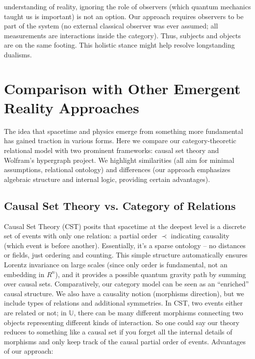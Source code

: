 \documentclass{article}
\begin{document}
\begin{description}
understanding of reality, ignoring the role of observers (which quantum mechanics taught us is important) is not an option. Our approach requires observers to be part of the system (no external classical observer was ever assumed; all measurements are interactions inside the category). Thus, subjects and objects are on the same footing. This holistic stance might help resolve longstanding dualisms.
\end{description}

\section{Comparison with Other Emergent Reality Approaches}

The idea that spacetime and physics emerge from something more fundamental has gained traction in various forms. Here we compare our category-theoretic relational model with two prominent frameworks: causal set theory and Wolfram’s hypergraph project. We highlight similarities (all aim for minimal assumptions, relational ontology) and differences (our approach emphasizes algebraic structure and internal logic, providing certain advantages).

\subsection{Causal Set Theory vs. Category of Relations}

Causal Set Theory (CST) posits that spacetime at the deepest level is a discrete set of events with only one relation: a partial order $\prec$ indicating causality (which event is before another)\cite{bombelli1987}. Essentially, it’s a sparse ontology – no distances or fields, just ordering and counting. This simple structure automatically ensures Lorentz invariance on large scales (since only order is fundamental, not an embedding in $R^n$), and it provides a possible quantum gravity path by summing over causal sets. Comparatively, our category model can be seen as an “enriched” causal structure. We also have a causality notion (morphisms direction), but we include types of relations and additional symmetries. In CST, two events either are related or not; in $\mathbb{U}$, there can be many different morphisms connecting two objects representing different kinds of interaction. So one could say our theory reduces to something like a causal set if you forget all the internal details of morphisms and only keep track of the causal partial order of events. Advantages of our approach:
\end{document}
